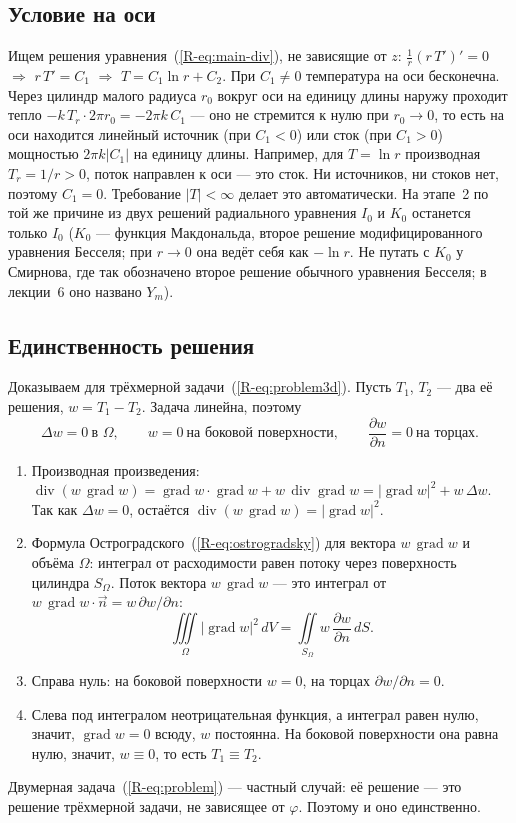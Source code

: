 \documentclass[a4paper,12pt]{article}
\newcommand{\rf}[1]{(\ref*{R-#1})}
\newcommand{\pd}[2]{\dfrac{\partial #1}{\partial #2}}
\DeclareMathOperator{\Div}{div}
\DeclareMathOperator{\Grad}{grad}
\begin{document}
\subsection{Условие на оси}
\label{der:axis}
Ищем решения уравнения~\rf{eq:main-div}, не зависящие от $z$:
$\frac1r(r\,T')'=0$ $\Rightarrow$ $r\,T'=C_1$ $\Rightarrow$
$T=C_1\ln r+C_2$. При $C_1\ne0$ температура на оси бесконечна. Через цилиндр
малого радиуса $r_0$ вокруг оси на единицу длины наружу проходит тепло
$-k\,T_r\cdot2\pi r_0=-2\pi k\,C_1$ — оно не стремится к нулю при
$r_0\to0$, то есть на оси находится линейный источник (при $C_1<0$) или сток
(при $C_1>0$) мощностью $2\pi k|C_1|$ на единицу длины. Например, для
$T=\ln r$ производная $T_r=1/r>0$, поток направлен к оси — это сток. Ни
источников, ни стоков нет, поэтому $C_1=0$. Требование $|T|<\infty$ делает
это автоматически. На этапе~2 по той же причине из двух решений радиального
уравнения $I_0$ и $K_0$ останется только $I_0$ ($K_0$ — функция
Макдональда, второе решение модифицированного уравнения Бесселя; при
$r\to0$ она ведёт себя как $-\ln r$. Не путать с $K_0$ у Смирнова, где так
обозначено второе решение обычного уравнения Бесселя; в лекции~6 оно
названо $Y_m$).

\subsection{Единственность решения}
\label{der:uniq}
Доказываем для трёхмерной задачи~\rf{eq:problem3d}. Пусть $T_1$, $T_2$ —
два её решения, $w=T_1-T_2$. Задача линейна, поэтому
\[
\Delta w=0\ \text{в }\Omega,\qquad w=0\ \text{на боковой поверхности},\qquad
\pd{w}{n}=0\ \text{на торцах}.
\]
\begin{enumerate}
  \item Производная произведения: $\Div(w\,\Grad w)=\Grad w\cdot\Grad w
  +w\,\Div\Grad w=|\Grad w|^2+w\,\Delta w$. Так как $\Delta w=0$, остаётся
  $\Div(w\,\Grad w)=|\Grad w|^2$.
  \item Формула Остроградского~\rf{eq:ostrogradsky} для вектора
  $w\,\Grad w$ и объёма $\Omega$: интеграл от расходимости равен потоку
  через поверхность цилиндра $S_\Omega$. Поток вектора $w\,\Grad w$ — это
  интеграл от $w\,\Grad w\cdot\vec n=w\,\partial w/\partial n$:
  \[
  \iiint\limits_{\Omega}|\Grad w|^{2}\,dV
  =\iint\limits_{S_\Omega} w\,\pd{w}{n}\,dS .
  \]
  \item Справа нуль: на боковой поверхности $w=0$, на торцах
  $\partial w/\partial n=0$.
  \item Слева под интегралом неотрицательная функция, а интеграл равен
  нулю, значит, $\Grad w=0$ всюду, $w$ постоянна. На боковой поверхности
  она равна нулю, значит, $w\equiv0$, то есть $T_1\equiv T_2$.
\end{enumerate}
Двумерная задача~\rf{eq:problem} — частный случай: её решение — это решение
трёхмерной задачи, не зависящее от $\varphi$. Поэтому и оно единственно.
\end{document}
